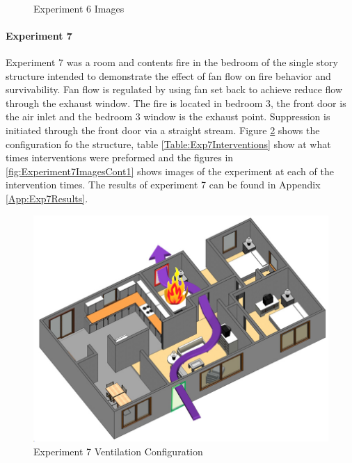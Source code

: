 \documentclass{article}
\begin{document}
\begin{figure}[H]
	\ContinuedFloat 
	\centering 
	 \ 
	\caption{Experiment 6 Images}
	\label{fig:Experiment6ImagesCont4} 
\end{figure}

\paragraph{Experiment 7}\mbox{}

Experiment 7 was a room and contents fire in the bedroom of the single story structure intended to demonstrate the effect of fan flow on fire behavior and survivability. Fan flow is regulated by using fan set back to achieve reduce flow through the exhaust window. The fire is located in bedroom 3, the front door is the air inlet and the bedroom 3 window is the exhaust point. Suppression is initiated through the front door via a straight stream. Figure \ref{fig:Exp7VentConfig} shows the configuration fo the structure, table \ref{Table:Exp7Interventions} show at what times interventions were preformed and the figures in \ref{fig:Experiment7ImagesCont1} shows images of the experiment at each of the intervention times. The results of experiment 7 can be found in Appendix \ref{App:Exp7Results}.

\begin{figure}[h!]
	\centering
	\includegraphics[width=5in]{0_Images/FireExperiments/Single_Story/Experiment_7.jpg}
	\caption{Experiment 7 Ventilation Configuration}
	\label{fig:Exp7VentConfig}
\end{figure}
\end{document}
